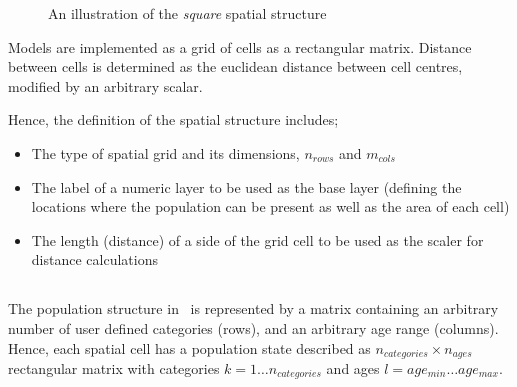 \begin{figure}[htp]
 \centering
  \caption{An illustration of the \emph{square} spatial structure}
  \label{fig:SquareSpatialStructure}
\end{figure}

Models are implemented as a grid of cells as a rectangular matrix. Distance between cells is determined as the euclidean distance between cell centres, modified by an arbitrary scalar. 

Hence, the definition of the spatial structure includes;
\begin{itemize}
\item The type of spatial grid and its dimensions, $n_{rows}$ and $m_{cols}$
\item The label of a numeric layer to be used as the base layer (defining the locations where the population can be present as well as the area of each cell)
\item The length (distance) of a side of the grid cell to be used as the scaler for distance calculations
\end{itemize}

\subsection{}

The population structure in \SPM\ is represented by a matrix containing an arbitrary number of user defined categories (rows), and an arbitrary age range (columns). Hence, each spatial cell has a population state described as $n_{categories} \times n_{ages}$ rectangular matrix with categories $k=1 \ldots n_{categories}$ and ages $l=age_{min} \ldots age_{max}$. 

